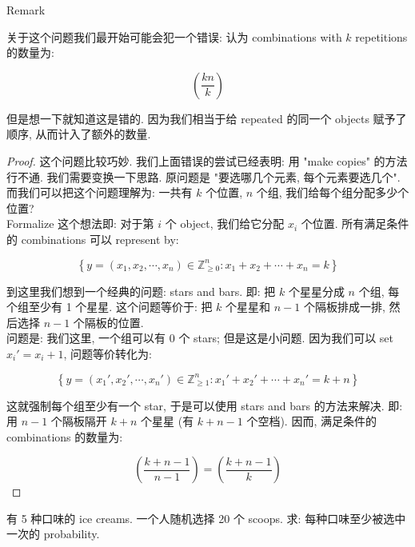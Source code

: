 \documentclass{qlnotes-export}
\begin{document}
\begin{qlremark}{Remark}

关于这个问题我们最开始可能会犯一个错误: 认为 combinations with \(k\) repetitions 的数量为:

\[\left( \frac{kn}{k} \right)\]

但是想一下就知道这是错的. 因为我们相当于给 repeated 的同一个 objects 赋予了顺序, 从而计入了额外的数量.

\end{qlremark}

\begin{proof}

这个问题比较巧妙. 我们上面错误的尝试已经表明: 用 "make copies" 的方法行不通. 我们需要变换一下思路. 原问题是 "要选哪几个元素, 每个元素要选几个". 而我们可以把这个问题理解为: 一共有 \(k\) 个位置, \(n\) 个组, 我们给每个组分配多少个位置?\\
Formalize 这个想法即: 对于第 \(i\) 个 object, 我们给它分配 \(x_{i}\) 个位置. 所有满足条件的 combinations 可以 represent by:

\[\left\{ {y = (x_{1},x_{2},\cdots,x_{n}) \in {\mathbb{Z}}_{\geq 0}^{n}:x_{1} + x_{2} + \cdots + x_{n} = k} \right\}\]

到这里我们想到一个经典的问题: stars and bars. 即: 把 \(k\) 个星星分成 \(n\) 个组, 每个组至少有 1 个星星. 这个问题等价于: 把 \(k\) 个星星和 \(n - 1\) 个隔板排成一排, 然后选择 \(n - 1\) 个隔板的位置.\\
问题是: 我们这里, 一个组可以有 \(0\) 个 stars; 但是这是小问题. 因为我们可以 set \(x_{i}' = x_{i} + 1\), 问题等价转化为:

\[\left\{ {y = (x_{1}',x_{2}',\cdots,x_{n}') \in {\mathbb{Z}}_{\geq 1}^{n}:x_{1}' + x_{2}' + \cdots + x_{n}' = k + n} \right\}\]

这就强制每个组至少有一个 star, 于是可以使用 stars and bars 的方法来解决. 即: 用 \(n - 1\) 个隔板隔开 \(k + n\) 个星星 (有 \(k + n - 1\) 个空档). 因而, 满足条件的 combinations 的数量为:

\[\left( \frac{k + n - 1}{n - 1} \right) = \left( \frac{k + n - 1}{k} \right)\]

\end{proof}

\begin{example}\label{ex-01-combinatorics-prob-space-example-005}

有 5 种口味的 ice creams. 一个人随机选择 20 个 scoops. 求: 每种口味至少被选中一次的 probability.

\end{example}
\end{document}
